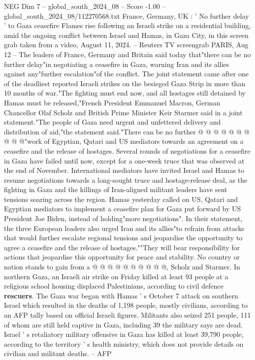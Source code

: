 \begin{textsample}{NEG Dim 7 – global\_south\_2024\_08 – Score -1.00 – global\_south\_2024\_08/112270568.txt}  \label{ex:f7_neg_276}
France, Germany, UK : ' No further delay ' to Gaza ceasefire Flames rise following an Israeli strike on a residential building, amid the ongoing conflict between Israel and Hamas, in Gaza City, in this screen grab taken from a video, August 11, 2024. -- Reuters TV screengrab PARIS, Aug 12 -- The leaders of France, Germany and Britain said today that"there can be no further delay"in negotiating a ceasefire in Gaza, warning Iran and its allies against any"further escalation"of the conflict.
The joint statement came after one of the deadliest reported Israeli strikes on the besieged Gaza Strip in more than 10 months of war."The fighting must end now, and all hostages still detained by Hamas must be released,"French President Emmanuel Macron, German Chancellor Olaf Scholz and British Prime Minister Keir Starmer said in a joint statement."The people of Gaza need urgent and unfettered delivery and distribution of aid,"the statement said."There can be no further @ @ @ @ @ @ @ @ @ @"work of Egyptian, Qatari and US mediators towards an agreement on a ceasefire and the release of hostages.
Several rounds of negotiations for a ceasefire in Gaza have failed until now, except for a one-week truce that was observed at the end of November.
International mediators have invited Israel and Hamas to resume negotiations towards a long-sought truce and hostage-release deal, as the fighting in Gaza and the killings of Iran-aligned militant leaders have sent tensions soaring across the region.
Hamas yesterday called on US, Qatari and Egyptian mediators to implement a ceasefire plan for Gaza put forward by US President Joe Biden, instead of holding"more negotiations".
In their statement, the three European leaders also urged Iran and its allies"to refrain from attacks that would further escalate regional tensions and jeopardise the opportunity to agree a ceasefire and the release of hostages.""They will bear responsibility for actions that jeopardise this opportunity for peace and stability.
No country or nation stands to gain from a @ @ @ @ @ @ @ @ @ @, Scholz and Starmer.
In northern Gaza, an Israeli air strike on Friday killed at least 93 people at a religious school housing displaced Palestinians, according to civil defence \textbf{rescuers}.
The Gaza war began with Hamas ' s October 7 attack on southern Israel which resulted in the deaths of 1,198 people, mostly civilians, according to an AFP tally based on official Israeli figures.
Militants also seized 251 people, 111 of whom are still held captive in Gaza, including 39 the military says are dead.
Israel ' s retaliatory military offensive in Gaza has killed at least 39,790 people, according to the territory ' s health ministry, which does not provide details on civilian and militant deaths. -- AFP

\end{textsample}
